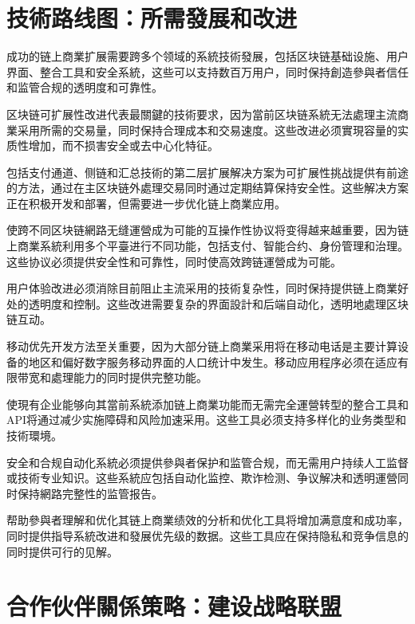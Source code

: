 \documentclass[
  Letterpaper,
]{scrbook}
\begin{document}
\section{技術路线图：所需發展和改进}\label{ux6280ux8853ux8defux7ebfux56feux6240ux9700ux767cux5c55ux548cux6539ux8fdb}

成功的链上商業扩展需要跨多个领域的系統技術發展，包括区块链基础设施、用户界面、整合工具和安全系統，这些可以支持数百万用户，同时保持創造參與者信任和监管合规的透明度和可靠性。

区块链可扩展性改进代表最關鍵的技術要求，因为當前区块链系統无法處理主流商業采用所需的交易量，同时保持合理成本和交易速度。这些改进必须實現容量的实质性增加，而不损害安全或去中心化特征。

包括支付通道、侧链和汇总技術的第二层扩展解决方案为可扩展性挑战提供有前途的方法，通过在主区块链外處理交易同时通过定期结算保持安全性。这些解决方案正在积极开发和部署，但需要进一步优化链上商業应用。

使跨不同区块链網路无缝運營成为可能的互操作性协议将变得越来越重要，因为链上商業系統利用多个平臺进行不同功能，包括支付、智能合约、身份管理和治理。这些协议必须提供安全性和可靠性，同时使高效跨链運營成为可能。

用户体验改进必须消除目前阻止主流采用的技術复杂性，同时保持提供链上商業好处的透明度和控制。这些改进需要复杂的界面設計和后端自动化，透明地處理区块链互动。

移动优先开发方法至关重要，因为大部分链上商業采用将在移动电话是主要计算设备的地区和偏好数字服务移动界面的人口统计中发生。移动应用程序必须在适应有限带宽和處理能力的同时提供完整功能。

使現有企业能够向其當前系統添加链上商業功能而无需完全運營转型的整合工具和API将通过减少实施障碍和风险加速采用。这些工具必须支持多样化的业务类型和技術環境。

安全和合规自动化系統必须提供參與者保护和监管合规，而无需用户持续人工监督或技術专业知识。这些系統应包括自动化监控、欺诈检测、争议解决和透明運營同时保持網路完整性的监管报告。

帮助參與者理解和优化其链上商業绩效的分析和优化工具将增加满意度和成功率，同时提供指导系統改进和發展优先级的数据。这些工具应在保持隐私和竞争信息的同时提供可行的见解。

\section{合作伙伴關係策略：建设战略联盟}\label{ux5408ux4f5cux4f19ux4f34ux95dcux4fc2ux7b56ux7565ux5efaux8bbeux6218ux7565ux8054ux76df}
\end{document}

